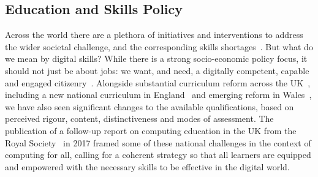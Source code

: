 \documentclass[sigconf]{acmart}
\begin{document}
\subsection{Education and Skills Policy}

Across the world there are a plethora of initiatives and interventions
to address the wider societal challenge, and the corresponding skills
shortages~\cite{cece:2017}. But what do we mean by digital skills?
While there is a strong socio-economic policy focus, it should not
just be about jobs: we want, and need, a digitally competent, capable
and engaged citizenry~\cite{tryfonas+crick:petra2018}. Alongside
substantial curriculum reform across the
UK~\cite{brown-et-al:toce2014}, including a new national curriculum in
England~\cite{DfE2013a} and emerging reform in
Wales~\cite{moller+crick:jce2018}, we have also seen significant
changes to the available qualifications, based on perceived rigour,
content, distinctiveness and modes of assessment.  The publication of
a follow-up report on computing education in the UK from the Royal
Society~\cite{rs:2017} in 2017 framed some of these national
challenges in the context of computing for all, calling for a coherent
strategy so that all learners are equipped and empowered with the
necessary skills to be effective in the digital world.

\end{document}
